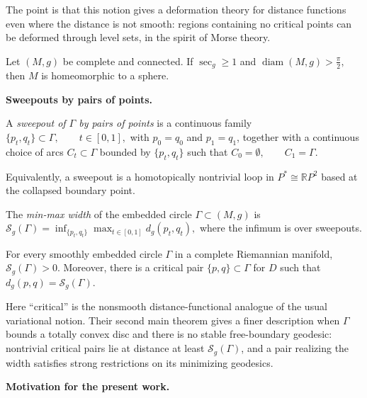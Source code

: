 \noindent
The point is that this notion gives a
deformation theory for distance functions
even where the distance is not smooth:
regions containing no critical points can
be deformed through level sets, in the
spirit of Morse theory.

\begin{theorem}
\label{theorem-grove-shiohama-diameter}
Let $(M,g)$ be complete and connected.
If
$
\sec_g\geq 1
$
and
$
\operatorname{diam}(M,g)>\frac{\pi}{2},
$
then $M$ is homeomorphic to a sphere.
\end{theorem}

\medskip\noindent
{\bf Sweepouts by pairs of points.}

\begin{definition}
A {\it sweepout of $\Gamma$ by pairs of
points} is a continuous family
$
\{p_t,q_t\}\subset\Gamma,
\qquad
t\in[0,1],
$
with $p_0=q_0$ and $p_1=q_1$, together
with a continuous choice of arcs
$C_t\subset\Gamma$ bounded by
$\{p_t,q_t\}$ such that
$
C_0=\emptyset,
\qquad
C_1=\Gamma.
$
\end{definition}

\noindent
Equivalently, a sweepout is a
homotopically nontrivial loop in
$P^*\cong\mathbb{R}P^2$ based at the
collapsed boundary point.

\begin{definition}
The {\it min-max width} of the embedded
circle $\Gamma\subset(M,g)$ is
$
\mathcal{S}_g(\Gamma)
=
\inf_{\{p_t,q_t\}}
\max_{t\in[0,1]}
d_g(p_t,q_t),
$
where the infimum is over sweepouts.
\end{definition}

\begin{theorem}
\label{theorem-ams-width-critical-pair}
For every smoothly embedded circle
$\Gamma$ in a complete Riemannian
manifold,
$
\mathcal{S}_g(\Gamma)>0.
$
Moreover, there is a critical pair
$\{p,q\}\subset\Gamma$ for $D$ such that
$
d_g(p,q)=\mathcal{S}_g(\Gamma).
$
\end{theorem}

\noindent
Here ``critical'' is the nonsmooth
distance-functional analogue of the
usual variational notion. Their second
main theorem gives a finer description
when $\Gamma$ bounds a totally convex
disc and there is no stable
free-boundary geodesic: nontrivial
critical pairs lie at distance at least
$\mathcal{S}_g(\Gamma)$, and a pair
realizing the width satisfies strong
restrictions on its minimizing
geodesics.

\medskip\noindent
{\bf Motivation for the present work.}

